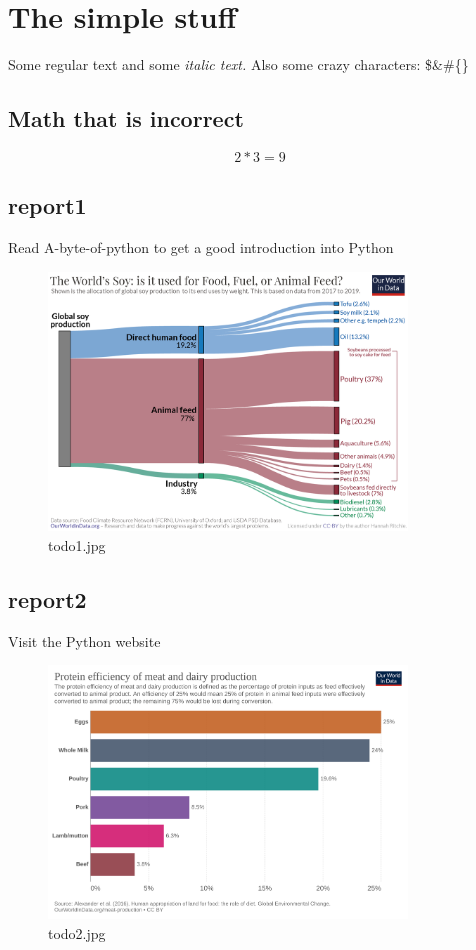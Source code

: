 \documentclass{article}%
\begin{document}
%
\normalsize%
\section{The simple stuff}%
\label{sec:Thesimplestuff}%
Some regular text and some%
\textit{italic text. }%
\newline%
Also some crazy characters: \$\&\#\{\}%
\subsection{Math that is incorrect}%
\label{subsec:Maththatisincorrect}%
\[%
2*3 = 9%
\]

%
\subsection{report1}%
\label{subsec:report1}%
Read A{-}byte{-}of{-}python to get a good introduction into Python%


\begin{figure}[! htb]%
\centering%
\includegraphics[width=360px]{todo1.jpg}%
\caption{todo1.jpg}%
\end{figure}

%
\FloatBarrier

%
\subsection{report2}%
\label{subsec:report2}%
Visit the Python website%


\begin{figure}[! htb]%
\centering%
\includegraphics[width=360px]{todo2.jpg}%
\caption{todo2.jpg}%
\end{figure}
\end{document}
